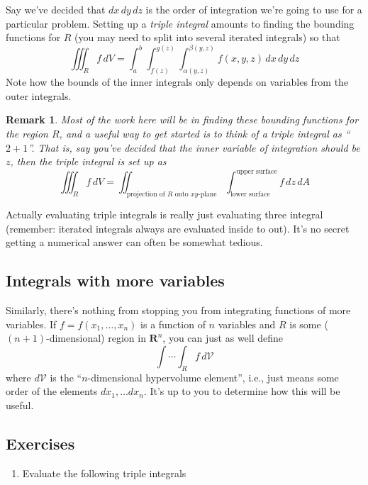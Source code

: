 \documentclass[12pt]{article}
\numberwithin{equation}{subsection}
\numberwithin{figure}{subsection}
\theoremstyle{note}
\newtheorem{remark}[subsection]{Remark}
\begin{document}
{Say we've decided that $dx\,dy\,dz$ is the order of integration we're going to use for a particular problem. Setting up a \textit{triple integral} amounts to finding the bounding functions for $R$  (you may need to split into several iterated integrals) so that \begin{equation} \iiint_R f\,dV = \int_a^b \int_{f(z)}^{g(z)}\int_{\alpha(y,z)}^{\beta(y,z)} f(x,y,z)\,dx\,dy\,dz\end{equation} Note how the bounds of the inner integrals only depends on variables from the outer integrals. 

\begin{remark} Most of the work here will be in finding these bounding functions for the region $R$, and a useful way to get started is to think of a triple integral as ``$2+1$''. That is, say you've decided that the inner variable of integration should be $z$, then the triple integral is set up as \[ \iiint_R f\,dV=\iint_{\text{projection of $R$ onto $xy$-plane}} \int_{\text{lower surface}}^{\text{upper surface}} f\,dz\,dA\] \end{remark}


Actually evaluating triple integrals is really just evaluating three integral (remember: iterated integrals always are evaluated inside to out). It's no secret getting a numerical answer can often be somewhat tedious. 
	
\subsection{Integrals with more variables} 
	 Similarly, there's nothing from stopping you from integrating functions of more variables. If $f=f(x_1,\dots,x_n)$ is a function of $n$ variables and $R$ is some ($(n+1)$-dimensional) region in $\mathbf{R}^n$, you can just as well define \begin{equation} \int \cdots \int_R f\,d\mathcal{V}\end{equation} where $d\mathcal{V}$ is the ``$n$-dimensional hypervolume element'', i.e.,  just means some order of the elements $dx_1, \dots dx_n$. It's up to you to determine how this will be useful. 


\subsection{Exercises}
\begin{enumerate}[label=\arabic*.]
\item Evaluate the following triple integrals


\end{enumerate}}
\end{document}
